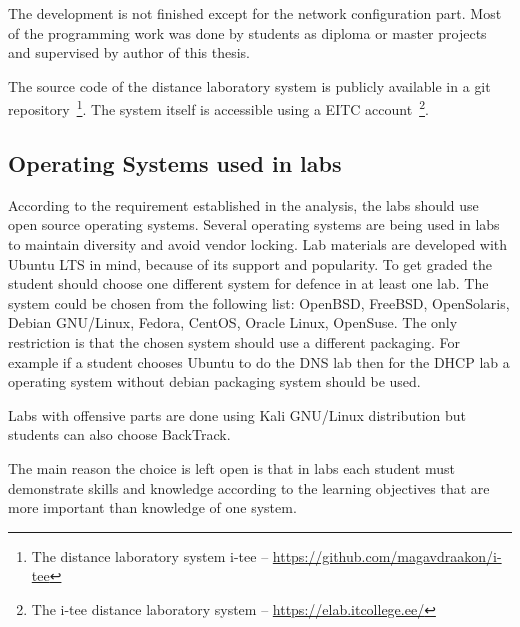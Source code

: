 The development is not finished except for the network configuration part. Most of the programming work was done by students as diploma or master projects and supervised by author of this thesis.

The source code of the distance laboratory system is publicly available in a \gls{git} repository~\footnote{The distance laboratory system i-tee -- \url{https://github.com/magavdraakon/i-tee}}.
The system itself is accessible using a \gls{EITC} account~\footnote{The i-tee distance laboratory system -- \url{https://elab.itcollege.ee/}}.
%

\subsection{Operating Systems used in labs}

According to the requirement established in the analysis, the labs should use open source operating systems.
Several operating systems are being used in labs to maintain diversity and avoid vendor locking.
Lab materials are developed with Ubuntu LTS in mind, because of its support and popularity. To get graded the student should choose one different system for defence in at least one lab. The system could be chosen from the following list: OpenBSD, FreeBSD, OpenSolaris, Debian GNU/Linux, Fedora, CentOS, Oracle Linux, OpenSuse. The only restriction is that the chosen system should use a different packaging. For example if a student chooses Ubuntu to do the \gls{DNS} lab then for the \gls{DHCP} lab a operating system without debian packaging system should be used.

Labs with offensive parts are done using Kali GNU/Linux distribution but students can also choose BackTrack.

The main reason the choice is left open is that in labs each student must demonstrate skills and knowledge according to the learning objectives that are more important than knowledge of one system.

